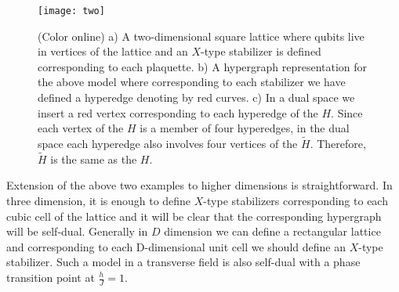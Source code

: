 \documentclass[preprintnumbers, showpacs, floatfix,twocolumn,
preprintnumbers, superscriptaddress]{revtex4}
\begin{document}
\begin{figure}[t]
\centering
\texttt{[image: two]}
\caption{(Color online) a) A two-dimensional square lattice where
qubits live in vertices of the lattice and an $X$-type stabilizer
is defined corresponding to each plaquette. b) A hypergraph
representation for the above model where corresponding to each
stabilizer we have defined a hyperedge denoting by red curves. c)
In a dual space we insert a red vertex corresponding to each
hyperedge of the $H$. Since each vertex of the $H$ is a member of
four hyperedges, in the dual space each hyperedge also involves
four vertices of the $\tilde{H}$. Therefore, $\tilde{H}$ is the
same as the $H$.} \label{two}
\end{figure}
Extension of the above two examples to higher dimensions is straightforward. In three dimension, it is enough to define $X$-type stabilizers corresponding to each cubic cell of the lattice and it will be clear that the corresponding hypergraph will be self-dual. Generally in $D$ dimension we can define a rectangular lattice and corresponding to each D-dimensional unit cell we should define an $X$-type stabilizer. Such a model in a transverse field is also self-dual with a phase transition point at $\frac{h}{J}=1$.
\end{document}

